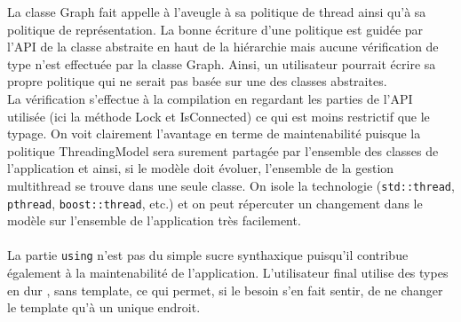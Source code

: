 La classe Graph fait appelle à l'aveugle à sa politique de thread ainsi qu'à sa politique de représentation. La bonne écriture d'une politique est guidée par l'API de la classe abstraite en haut de la hiérarchie mais aucune vérification de type n'est effectuée par la classe Graph. Ainsi, un utilisateur pourrait écrire sa propre politique qui ne serait pas basée sur une des classes abstraites.\\
La vérification s'effectue à la compilation en regardant les parties de l'API utilisée (ici la méthode Lock et IsConnected) ce qui est moins restrictif que le typage. On voit clairement l'avantage en terme de maintenabilité puisque la politique ThreadingModel sera surement partagée par l'ensemble des classes de l'application et ainsi, si le modèle doit évoluer, l'ensemble de la gestion multithread se trouve dans une seule classe. On isole la technologie (\verb|std::thread|, \verb|pthread|, \verb|boost::thread|, etc.) et on peut répercuter un changement dans le modèle sur l'ensemble de l'application très facilement.\\\\
La partie \verb|using| n'est pas du simple sucre synthaxique puisqu'il contribue également à la maintenabilité de l'application. L'utilisateur final utilise des types en \og{} dur \fg, sans template, ce qui permet, si le besoin s'en fait sentir, de ne changer le template qu'à un unique endroit.

